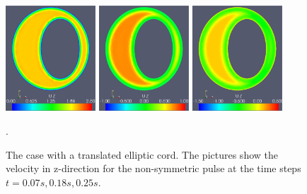 \begin{figure}\begin{center}
\includegraphics[width=0.3\textwidth]{chapters/hentschel/pdf/pulse_f1_08_elliptic_eccentric_sysmax_nmb7.pdf}
\includegraphics[width=0.3\textwidth]{chapters/hentschel/pdf/pulse_f1_08_elliptic_eccentric_sysdia_nmb18.pdf}
\includegraphics[width=0.3\textwidth]{chapters/hentschel/pdf/pulse_f1_08_elliptic_eccentric_diamin1_nmb25.pdf}
\caption{The case with a translated elliptic cord. The pictures show the velocity in z-direction for the non-symmetric pulse at the time steps $t=0.07s, 0.18s, 0.25s$.}
\label{fig:case3b}.
\end{center}\end{figure}


